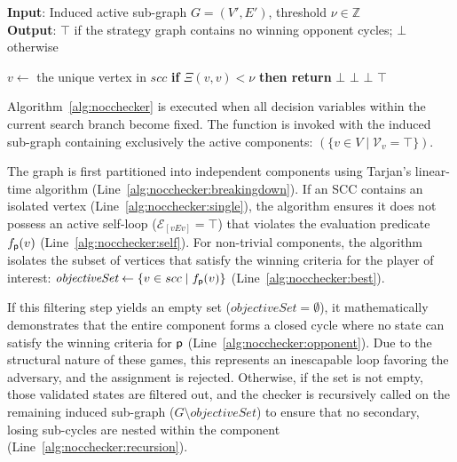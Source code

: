 \documentclass[a4paper,fleqn]{cas-sc}
\begin{document}
\begin{algorithm}[htb]
\small
\caption{\textbf{\nocchecker-Qt}}
\textbf{Input}:  Induced active sub-graph $G = (V', E')$,
                 threshold $\nu \in \mathbb{Z}$ \\
\textbf{Output}: $\top$ if the strategy graph contains no winning opponent cycles;
                 $\bot$ otherwise
\begin{algorithmic}[1]
    \label{alg:nocqt:tarjan}
        \label{alg:nocqt:single}
            \STATE $v \gets$ the unique vertex in $\textit{scc}$
            \label{alg:nocqt:selfloop}
                \STATE \textbf{if } $\Xi(v,v) < \nu$
                       \textbf{ then return } $\bot$
                \label{alg:nocqt:selfenergy}
            \ENDIF
        \ELSE
            \label{alg:nocqt:energy}
                \RETURN $\bot$
            \ENDIF
            \label{alg:nocqt:mean}
                \RETURN $\bot$
            \ENDIF
        \ENDIF
    \ENDFOR
    \RETURN $\top$
\end{algorithmic}
\label{alg:noccheckerQuant}
\end{algorithm}

Algorithm~\ref{alg:nocchecker} is executed when all decision variables within the current search branch become fixed. The function is invoked with the induced sub-graph containing exclusively the active components: \nocchecker$(\{ v \in V \mid \mathcal{V}_v = \top \})$.

The graph is first partitioned into independent components using Tarjan's linear-time algorithm (Line~\ref{alg:nocchecker:breakingdown}). If an SCC contains an isolated vertex (Line~\ref{alg:nocchecker:single}), the algorithm ensures it does not possess an active self-loop ($\mathcal{E}_{[vEv]} = \top$) that violates the evaluation predicate $f_{\mathsf{p}}(v)$ (Line~\ref{alg:nocchecker:self}). For non-trivial components, the algorithm isolates the subset of vertices that satisfy the winning criteria for the player of interest: $\textit{objectiveSet} \gets \{ v \in scc \mid f_{\mathsf{p}}(v) \}$ (Line~\ref{alg:nocchecker:best}). 

If this filtering step yields an empty set ($\textit{objectiveSet} = \emptyset$), it mathematically demonstrates that the entire component forms a closed cycle where no state can satisfy the winning criteria for $\mathsf{p}$ (Line~\ref{alg:nocchecker:opponent}). Due to the structural nature of these games, this represents an inescapable loop favoring the adversary, and the assignment is rejected. Otherwise, if the set is not empty, those validated states are filtered out, and the checker is recursively called on the remaining induced sub-graph ($G \setminus \textit{objectiveSet}$) to ensure that no secondary, losing sub-cycles are nested within the component (Line~\ref{alg:nocchecker:recursion}).
\end{document}
